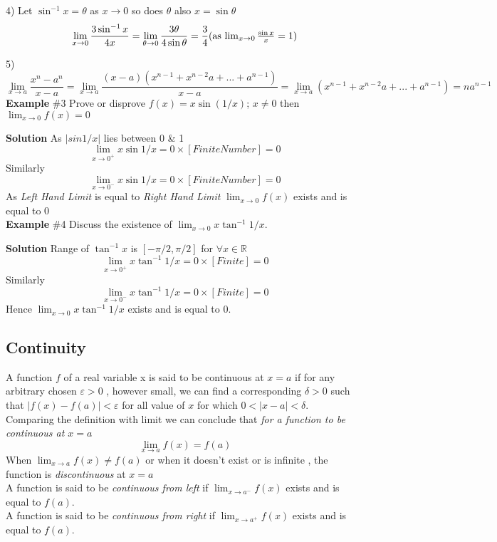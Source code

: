 \documentclass[10pt,a4paper]{article}
\begin{document}
 4) Let $\sin^{-1}x=\theta$ as $x \to 0$ so does $\theta$ also $x=\sin \theta$
 \begin{equation*}
 \lim_{x \to 0}\frac{3\sin^{-1}x}{4x}= \lim_{\theta \to 0}\frac{3\theta}{4\sin\theta}=\frac{3}{4} $\\$($as $ \lim_{x \to 0} \frac{\sin x}{x}=1)
 \end{equation*} 
 \par 5) 
 \begin{equation*}
 \lim_{x \to a}\frac{x^n-a^n}{x-a}=\lim_{x \to a}\frac{(x-a)(x^{n-1}+x^{n-2}a+...+a^{n-1})}{x-a}=\lim_{x \to a}(x^{n-1}+x^{n-2}a+...+a^{n-1})=na^{n-1}
 \end{equation*}
 \textbf{Example }\#3  Prove or disprove $f(x)= x\sin (1/x) $; $x\neq0$ then $\lim_{x \to 0} f(x) =0$ \par \textbf{Solution } As $|sin 1/x|$  lies between 0 \& 1 \begin{equation*}
 \lim_{x \to 0^+} x\sin 1/x = 0\times[Finite Number] = 0
 \end{equation*} Similarly 
 \begin{equation*}
 \lim_{x \to 0^-} x \sin 1/x = 0 \times[Finite Number]=0
 \end{equation*} As \emph{Left Hand Limit} is equal to \emph{Right Hand Limit} $\lim_{x \to 0} f(x)$ exists and is equal to $0$ 
 \\ \textbf{Example }\#4 Discuss the existence of $\lim_{x \to 0}x\tan^{-1}1/x$. \par \textbf{Solution } Range of $\tan^{-1} x$ is $[-\pi/2,\pi/2]$ for $\forall x\in \mathbb{R}$ 
 \begin{equation*}
 \lim_{x \to 0^+} x \tan^{-1} 1/x = 0\times[Finite]=0
 \end{equation*}Similarly 
 \begin{equation*}
 \lim_{x \to 0^-} x \tan^{-1} 1/x = 0\times[Finite]=0
 \end{equation*} 
 Hence $\lim_{x \to 0} x\tan^{-1} 1/x$ exists and is equal to 0.
 \subsection{Continuity}
 A function $f$ of a real variable x is said to be continuous at $x=a$ if for any arbitrary chosen $\varepsilon>0$ , however small, we can find a corresponding $\delta > 0$ such that $|f(x)-f(a)|<\varepsilon$ for all value of $x$ for which $0<|x-a|< \delta$. \\ Comparing the definition with limit we can conclude that \emph{for a function to be continuous at $x=a$} 
 \begin{equation*}
 \lim_{x \to a} f(x) = f(a)
 \end{equation*} 
 When $\lim_{x \to a} f(x) \neq f(a)$ or when it doesn't exist or is infinite , the function is \emph{discontinuous} at $x=a$ 
\\ A function is said to be \emph{continuous from left} if $\lim_{x \to a^-} f(x)$ exists and is equal to $f(a)$.
\\ A function is said to be \emph{continuous from right} if $\lim_{x \to a^+} f(x)$ exists and is equal to $f(a)$.
\end{document}
